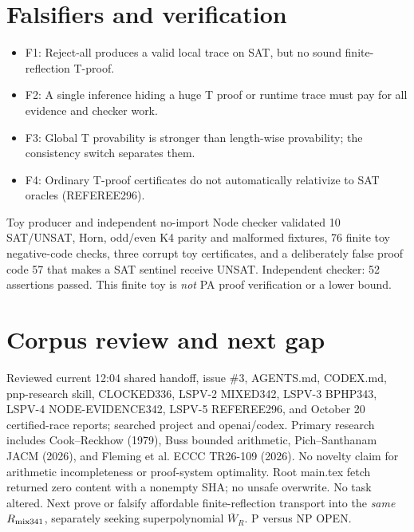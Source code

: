\documentclass[11pt]{article}
\begin{document}
\section{Falsifiers and verification}
\begin{itemize}
\item[] F1: Reject-all produces a valid local trace on SAT, but no sound finite-reflection T-proof.
\item[] F2: A single inference hiding a huge T proof or runtime trace must pay for all evidence and checker work.
\item[] F3: Global T provability is stronger than length-wise provability; the consistency switch separates them.
\item[] F4: Ordinary T-proof certificates do not automatically relativize to SAT oracles (REFEREE296).
\end{itemize}
Toy producer and independent no-import Node checker validated 10 SAT/UNSAT, Horn, odd/even K4 parity and malformed fixtures, 76 finite toy negative-code checks, three corrupt toy certificates, and a deliberately false proof code 57 that makes a SAT sentinel receive UNSAT. Independent checker: 52 assertions passed. This finite toy is \emph{not} PA proof verification or a lower bound.
\section{Corpus review and next gap}
Reviewed current 12:04 shared handoff, issue \#3, AGENTS.md, CODEX.md, pnp-research skill, CLOCKED336, LSPV-2 MIXED342, LSPV-3 BPHP343, LSPV-4 NODE-EVIDENCE342, LSPV-5 REFEREE296, and October 20 certified-race reports; searched project and openai/codex. Primary research includes Cook--Reckhow (1979), Buss bounded arithmetic, Pich--Santhanam JACM (2026), and Fleming et al. ECCC TR26-109 (2026). No novelty claim for arithmetic incompleteness or proof-system optimality. Root main.tex fetch returned zero content with a nonempty SHA; no unsafe overwrite. No task altered. Next prove or falsify affordable finite-reflection transport into the \emph{same} $R_{\rm mix341}$, separately seeking superpolynomial $\overline W_R$. P versus NP OPEN.
\end{document}
